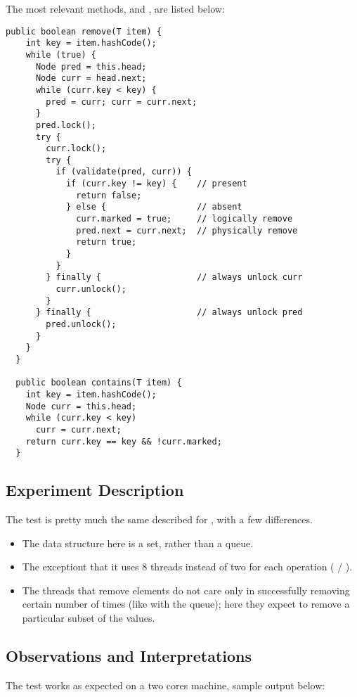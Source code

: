 The most relevant methods,  and , are listed
below: \\

\begin{lstlisting}[style=numbers]
  public boolean remove(T item) {
    int key = item.hashCode();
    while (true) {
      Node pred = this.head;
      Node curr = head.next;
      while (curr.key < key) {
        pred = curr; curr = curr.next;
      }
      pred.lock();
      try {
        curr.lock();
        try {
          if (validate(pred, curr)) {
            if (curr.key != key) {    // present
              return false;
            } else {                  // absent
              curr.marked = true;     // logically remove
              pred.next = curr.next;  // physically remove
              return true;
            }
          }
        } finally {                   // always unlock curr
          curr.unlock();
        }
      } finally {                     // always unlock pred
        pred.unlock();
      }
    }
  }

  public boolean contains(T item) {
    int key = item.hashCode();
    Node curr = this.head;
    while (curr.key < key)
      curr = curr.next;
    return curr.key == key && !curr.marked;
  }
\end{lstlisting}
\hfill

\subsection{Experiment Description}
The test is pretty much the same described for ,
with a few differences.

\begin{itemize}
\item The data structure here is a set, rather than a queue.
\item The exceptiont that it uses 8 threads instead of two for each
  operation ( / ).
\item The threads that remove elements do not care only in
  successfully removing certain number of times (like with the queue);
  here they expect to remove a particular subset of the values.
\end{itemize}
  

\subsection{Observations and Interpretations}

The test works as expected on a two cores machine, sample output below:

